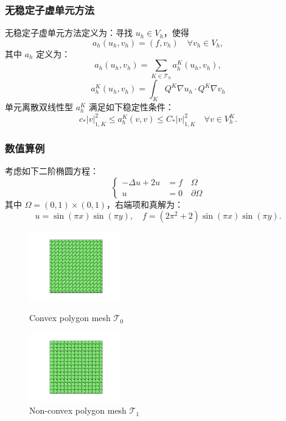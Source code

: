 \documentclass[notheorems,serif]{beamer}
\begin{document}
\begin{frame}
\frametitle{无稳定子虚单元方法}
无稳定子虚单元方法定义为：寻找 $u_h \in V_h$，使得
$$
a_h(u_h, v_h) = (f, v_h) \quad \forall v_h \in V_h,
$$
其中 $a_h$ 定义为：
$$
a_h(u_h, v_h) = \sum_{K \in \mathcal{T}_h} a_h^K(u_h, v_h),
$$
$$
a_h^K(u_h, v_h) = \int_K Q^K\nabla  u_h \cdot Q^K\nabla v_h 
$$
单元离散双线性型 $a_h^K$ 满足如下稳定性条件：
$$
c_* |v|_{1, K}^2 \leq a_h^K(v, v) \leq C_* |v|_{1, K}^2 \quad \forall v \in
V_h^K.
$$
\end{frame}

\begin{frame}
\frametitle{数值算例}
考虑如下二阶椭圆方程：
$$
\left\{
\begin{aligned}
    -\Delta u + 2u & = f \quad \Omega\\
    u & = 0 \quad \partial\Omega
\end{aligned}
\right.
$$
其中 $\Omega = (0, 1)\times(0, 1)$，右端项和真解为：
$$
u = \sin(\pi x)\sin(\pi y), \quad f = (2\pi^2+2)\sin(\pi x)\sin(\pi y).
$$

\begin{figure}[htb p]
\centering
\begin{minipage}[t]{0.49\linewidth}
\centering
\includegraphics[width=4cm]{../figures/convex.pdf}
\caption{Convex polygon mesh $\mathcal T_0$}
\end{minipage}%
\begin{minipage}[t]{0.49\linewidth}
\centering
\includegraphics[width=4cm]{../figures/nonconvex.pdf}
\caption{Non-convex polygon mesh $\mathcal T_1$}
\end{minipage}%
\centering
\end{figure}
\end{frame}
\end{document}
